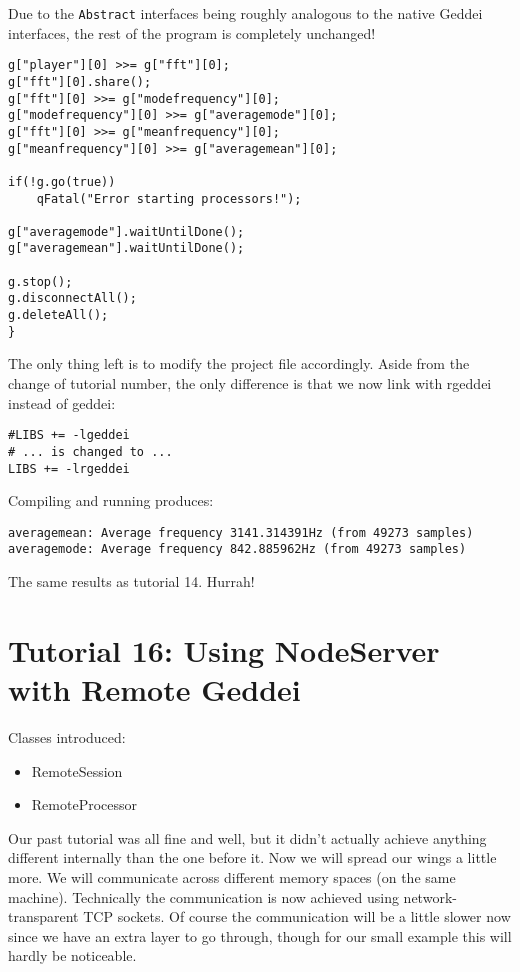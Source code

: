 Due to the \texttt{Abstract} interfaces being roughly analogous to the native Geddei interfaces, the rest of the program is completely unchanged!

\begin{verbatim}
g["player"][0] >>= g["fft"][0];
g["fft"][0].share();
g["fft"][0] >>= g["modefrequency"][0];
g["modefrequency"][0] >>= g["averagemode"][0];
g["fft"][0] >>= g["meanfrequency"][0];
g["meanfrequency"][0] >>= g["averagemean"][0];

if(!g.go(true))
    qFatal("Error starting processors!");

g["averagemode"].waitUntilDone();
g["averagemean"].waitUntilDone();

g.stop();
g.disconnectAll();
g.deleteAll();
}
\end{verbatim}

The only thing left is to modify the project file accordingly. Aside from the change of tutorial number, the only difference is that we now link with rgeddei instead of geddei:

\begin{verbatim}
#LIBS += -lgeddei
# ... is changed to ...
LIBS += -lrgeddei
\end{verbatim}

Compiling and running produces:

\begin{verbatim}
averagemean: Average frequency 3141.314391Hz (from 49273 samples)
averagemode: Average frequency 842.885962Hz (from 49273 samples)
\end{verbatim}

The same results as tutorial 14. Hurrah!




\section{Tutorial 16: Using NodeServer with Remote Geddei}

Classes introduced:
\begin{itemize}
\item RemoteSession
\item RemoteProcessor
\end{itemize}

Our past tutorial was all fine and well, but it didn't actually achieve anything different internally than the one before it. Now we will spread our wings a little more. We will communicate across different memory spaces (on the same machine). Technically the communication is now achieved using network-transparent TCP sockets. Of course the communication will be a little slower now since we have an extra layer to go through, though for our small example this will hardly be noticeable.

